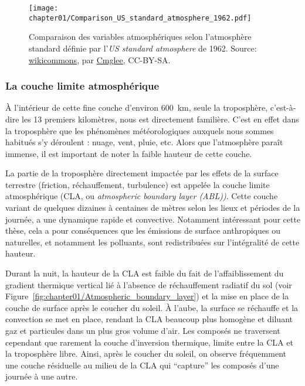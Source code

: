 \begin{figure}[ht]
    \centering
    \texttt{[image: chapter01/Comparison\_US\_standard\_atmosphere\_1962.pdf]}
    \caption{%
        Comparaison des variables atmosphériques selon l'atmosphère standard définie par
        l'\textit{US standard atmosphere} de 1962.
        Source:
        \href{https://commons.wikimedia.org/wiki/File:Comparison_US_standard_atmosphere_1962.svg}{wikicommons},
        par \href{https://commons.wikimedia.org/wiki/User:Cmglee}{Cmglee}, CC-BY-SA.
    }%
    \label{fig:chapter01/Comparison_US_standard_atmosphere_1962}
\end{figure}

\subsubsection{La couche limite atmosphérique}%
\label{sub:la_couche_limite_atmospherique}

À l'intérieur de cette fine couche d'environ \SI{600}{km}, seule la troposphère,
c'est-à-dire les 13 premiers kilomètres, nous est directement familière. C'est en effet
dans la troposphère que les phénomènes météorologiques auxquels nous sommes habitués s'y
déroulent : nuage, vent, pluie, etc. Alors que l'atmosphère paraît immense, il est
important de noter la faible hauteur de cette couche.

La partie de la troposphère directement impactée par les effets de la surface terrestre
(friction, réchauffement, turbulence) est appelée la couche limite atmosphérique (CLA, ou
\textit{atmospheric boundary layer (ABL))}. Cette couche variant de quelques dizaines à centaines
de mètres selon les lieux et périodes de la journée, a une dynamique rapide et
convective. Notamment intéressant pour cette thèse, cela a pour conséquences que les
émissions de surface anthropiques ou naturelles, et notamment les polluants, sont
redistribuées sur l'intégralité de cette hauteur.

Durant la nuit, la hauteur de la CLA est faible du fait de l'affaiblissement du
gradient thermique vertical lié à l'absence de réchauffement radiatif du sol (voir
Figure~\ref{fig:chapter01/Atmospheric_boundary_layer}) et la mise en place de la couche de
surface après le coucher du soleil. À l'aube, la surface se réchauffe et la
convection se met en place, rendant la CLA beaucoup plus homogène et diluant gaz et
particules dans un plus gros volume d'air. Les composés ne traversent cependant que
rarement la couche d'inversion thermique, limite entre la CLA et la troposphère libre.
Ainsi, après le coucher du soleil, on observe fréquemment une couche résiduelle au milieu de
la CLA qui ``capture'' les composés d'une journée à une autre.

